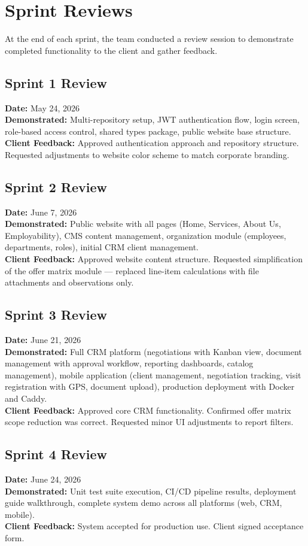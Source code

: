 \documentclass[letterpaper%
, oneside%
, 12pt%
, memoireprojet%
, english%
,creativecommons,hyperref, withAlgo2e %
]{thETS}
\begin{document}
\section{Sprint Reviews}
At the end of each sprint, the team conducted a review session to demonstrate completed functionality to the client and gather feedback.

\subsection{Sprint 1 Review}
\textbf{Date:} May 24, 2026 \\
\textbf{Demonstrated:} Multi-repository setup, JWT authentication flow, login screen, role-based access control, shared types package, public website base structure. \\
\textbf{Client Feedback:} Approved authentication approach and repository structure. Requested adjustments to website color scheme to match corporate branding.

\subsection{Sprint 2 Review}
\textbf{Date:} June 7, 2026 \\
\textbf{Demonstrated:} Public website with all pages (Home, Services, About Us, Employability), CMS content management, organization module (employees, departments, roles), initial CRM client management. \\
\textbf{Client Feedback:} Approved website content structure. Requested simplification of the offer matrix module --- replaced line-item calculations with file attachments and observations only.

\subsection{Sprint 3 Review}
\textbf{Date:} June 21, 2026 \\
\textbf{Demonstrated:} Full CRM platform (negotiations with Kanban view, document management with approval workflow, reporting dashboards, catalog management), mobile application (client management, negotiation tracking, visit registration with GPS, document upload), production deployment with Docker and Caddy. \\
\textbf{Client Feedback:} Approved core CRM functionality. Confirmed offer matrix scope reduction was correct. Requested minor UI adjustments to report filters.

\subsection{Sprint 4 Review}
\textbf{Date:} June 24, 2026 \\
\textbf{Demonstrated:} Unit test suite execution, CI/CD pipeline results, deployment guide walkthrough, complete system demo across all platforms (web, CRM, mobile). \\
\textbf{Client Feedback:} System accepted for production use. Client signed acceptance form.
\end{document}
